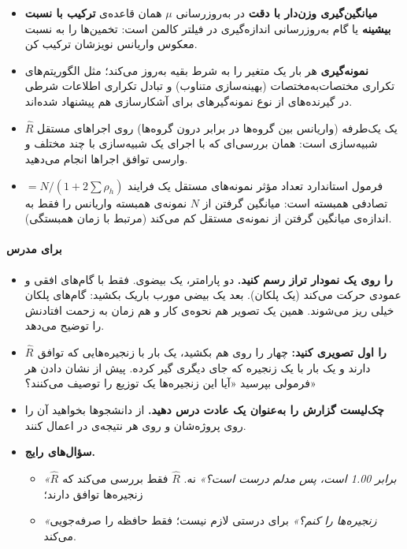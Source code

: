 \begin{itemize}
\tightlist
\item
  \textbf{میانگین‌گیری وزن‌دار با دقت} در به‌روزرسانی \(\mu\) همان قاعده‌ی
  \textbf{ترکیب با نسبت بیشینه } یا گام به‌روزرسانی اندازه‌گیری
  در فیلتر کالمن است: تخمین‌ها را به نسبت معکوس واریانس نویزشان ترکیب کن.
\item
  \textbf{نمونه‌گیری } هر بار یک متغیر را به شرط بقیه به‌روز
  می‌کند؛ مثل الگوریتم‌های تکراری مختصات‌به‌مختصات (بهینه‌سازی متناوب) و
  تبادل تکراری اطلاعات شرطی در گیرنده‌های از نوع  نمونه‌گیرهای
   برای آشکارسازی  هم پیشنهاد شده‌اند.
\item
  \textbf{\(\hat R\)} یک  یک‌طرفه (واریانس بین گروه‌ها در برابر
  درون گروه‌ها) روی اجراهای مستقل شبیه‌سازی است: همان بررسی‌ای که با اجرای
  یک شبیه‌سازی  با چند  مختلف و وارسی توافق
  اجراها انجام می‌دهید.
\item
  \textbf{} \(= N/(1 + 2\sum\rho_h)\) فرمول استاندارد تعداد مؤثر
  نمونه‌های مستقل یک فرایند تصادفی همبسته است: میانگین گرفتن از \(N\)
  نمونه‌ی همبسته واریانس را فقط به اندازه‌ی میانگین گرفتن از 
  نمونه‌ی مستقل کم می‌کند (مرتبط با زمان همبستگی).
\end{itemize}

\paragraph{برای مدرس}

\begin{itemize}
\tightlist
\item
  \textbf{ را روی یک نمودار تراز رسم کنید.} دو پارامتر، یک
   بیضوی.  فقط با گام‌های افقی و عمودی حرکت می‌کند
  (یک پلکان). بعد یک بیضی مورب باریک بکشید: گام‌های پلکان خیلی ریز
  می‌شوند. همین یک تصویر هم نحوه‌ی کار  و هم زمان به زحمت
  افتادنش را توضیح می‌دهد.
\item
  \textbf{\(\hat R\) را اول تصویری کنید:} چهار  را روی هم
  بکشید، یک بار با زنجیره‌هایی که توافق دارند و یک بار با یک زنجیره که
  جای دیگری گیر کرده. پیش از نشان دادن هر فرمولی بپرسید «آیا این
  زنجیره‌ها یک توزیع را توصیف می‌کنند؟»
\item
  \textbf{چک‌لیست گزارش را به‌عنوان یک عادت درس دهید.} از دانشجوها بخواهید
  آن را روی پروژه‌شان و روی هر نتیجه‌ی  در  اعمال کنند.
\item
  \textbf{سؤال‌های رایج.}

  \begin{itemize}
  \tightlist
  \item
    \emph{«\(\hat R\) برابر 1.00 است، پس مدلم درست است؟»} نه. \(\hat R\)
    فقط بررسی می‌کند که زنجیره‌ها توافق دارند؛
  \item
    \emph{«زنجیره‌ها را  کنم؟»} برای درستی لازم نیست؛ فقط حافظه
    را صرفه‌جویی می‌کند.
  \end{itemize}
\end{itemize}

